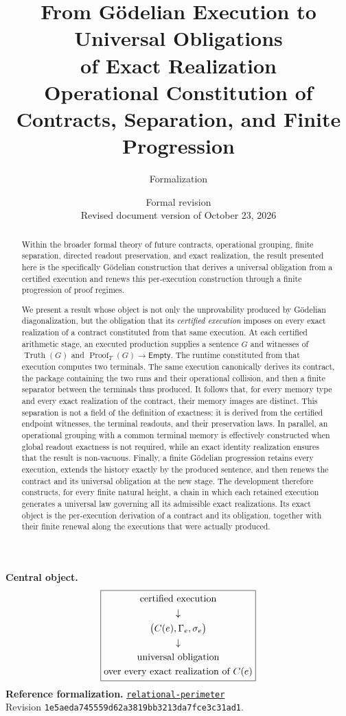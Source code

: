 \documentclass[11pt,a4paper]{article}
\title{From Gödelian Execution to Universal Obligations\\
  of Exact Realization\\[5pt]
  \large Operational Constitution of Contracts, Separation, and Finite Progression}
\author{Formalization \code{relational-perimeter}}
\date{Formal revision \code{1e5aeda74555}\\
  \small Revised document version of October 23, 2026}
\newcommand{\Truth}{\operatorname{Truth}}
\newcommand{\Proof}{\operatorname{Proof}}
\newcommand{\Empty}{\mathsf{Empty}}
\newcommand{\code}[1]{\nolinkurl{#1}}
\newcommand{\MainAxis}{%
  \begin{gathered}
  \text{certified execution}\\
  \downarrow\\
  \bigl(C(e),\Gamma_e,\sigma_e\bigr)\\
  \downarrow\\
  \text{universal obligation}\\
  \text{over every exact realization of }C(e)
  \end{gathered}}
\theoremstyle{remark}
\begin{document}
\maketitle
\vspace{-1.4em}

\begin{abstract}
Within the broader formal theory of future contracts, operational grouping,
finite separation, directed readout preservation, and exact realization, the
result presented here is the specifically Gödelian construction that derives
a universal obligation from a certified execution and renews this
per-execution construction through a finite progression of proof regimes.

We present a result whose object is not only the unprovability produced by
Gödelian diagonalization, but the obligation that its \emph{certified
execution} imposes on every exact realization of a contract constituted
from that same execution. At each certified arithmetic stage, an executed
production supplies a sentence $G$ and witnesses of $\Truth(G)$ and
$\Proof_T(G)\to\Empty$. The runtime constituted from that execution computes
two terminals. The same execution canonically derives its contract, the
package containing the two runs and their operational collision, and then a
finite separator between the terminals thus produced. It follows that, for
every memory type and every exact realization of the contract, their memory
images are distinct. This separation is not a field of the definition of
exactness: it is derived from the certified endpoint witnesses, the terminal
readouts, and their preservation laws. In parallel, an
operational grouping with a common terminal memory is effectively
constructed when global readout exactness is not required, while an exact
identity realization ensures that the result is non-vacuous. Finally, a
finite Gödelian progression retains every execution, extends the history
exactly by the produced sentence, and then renews the contract and its
universal obligation at the new stage. The development therefore constructs,
for every finite natural height, a chain in which each retained execution
generates a universal law governing all its admissible exact realizations.
Its exact object is the per-execution derivation of a contract and its
obligation, together with their finite renewal along the executions that were
actually produced.
\end{abstract}

\noindent\textbf{Central object.}
\[
\boxed{\MainAxis}
\]
\noindent\textbf{Reference formalization.}
\href{https://github.com/JohnDoe-collab-stack/relational-perimeter}{\code{relational-perimeter}}\\
Revision \code{1e5aeda745559d62a3819bb3213da7fce3c31ad1}.
\end{document}
